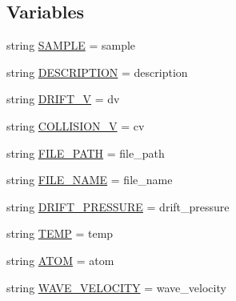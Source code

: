 \subsection*{Variables}
\begin{DoxyCompactItemize}
\item 
string \hyperlink{namespace_uni_dec_1_1unidec__modules_1_1tims__import__wizard_1_1_tag_types_a9037ee696451cc7485ee9fe1deca2dae}{S\+A\+M\+P\+L\+E} = \textquotesingle{}sample\textquotesingle{}
\item 
string \hyperlink{namespace_uni_dec_1_1unidec__modules_1_1tims__import__wizard_1_1_tag_types_a98a471d99be4bf079d51798235be79b3}{D\+E\+S\+C\+R\+I\+P\+T\+I\+O\+N} = \textquotesingle{}description\textquotesingle{}
\item 
string \hyperlink{namespace_uni_dec_1_1unidec__modules_1_1tims__import__wizard_1_1_tag_types_a6e65191c0c073808709bf24baa7c6ecf}{D\+R\+I\+F\+T\+\_\+\+V} = \textquotesingle{}dv\textquotesingle{}
\item 
string \hyperlink{namespace_uni_dec_1_1unidec__modules_1_1tims__import__wizard_1_1_tag_types_ad737928630b2ee73fea7cdfc1906eb77}{C\+O\+L\+L\+I\+S\+I\+O\+N\+\_\+\+V} = \textquotesingle{}cv\textquotesingle{}
\item 
string \hyperlink{namespace_uni_dec_1_1unidec__modules_1_1tims__import__wizard_1_1_tag_types_a6a080ac8379dd1c3ccef9113da2a8d1a}{F\+I\+L\+E\+\_\+\+P\+A\+T\+H} = \textquotesingle{}file\+\_\+path\textquotesingle{}
\item 
string \hyperlink{namespace_uni_dec_1_1unidec__modules_1_1tims__import__wizard_1_1_tag_types_a97d40ed16eb01a95199c2d1911814bce}{F\+I\+L\+E\+\_\+\+N\+A\+M\+E} = \textquotesingle{}file\+\_\+name\textquotesingle{}
\item 
string \hyperlink{namespace_uni_dec_1_1unidec__modules_1_1tims__import__wizard_1_1_tag_types_a8940a4cfb1960233e95aac55f3f98792}{D\+R\+I\+F\+T\+\_\+\+P\+R\+E\+S\+S\+U\+R\+E} = \textquotesingle{}drift\+\_\+pressure\textquotesingle{}
\item 
string \hyperlink{namespace_uni_dec_1_1unidec__modules_1_1tims__import__wizard_1_1_tag_types_a17d5dbf87f89e483b5ca64feb7776f44}{T\+E\+M\+P} = \textquotesingle{}temp\textquotesingle{}
\item 
string \hyperlink{namespace_uni_dec_1_1unidec__modules_1_1tims__import__wizard_1_1_tag_types_a10264a8685c2679af34e5b4d501e70d7}{A\+T\+O\+M} = \textquotesingle{}atom\textquotesingle{}
\item 
string \hyperlink{namespace_uni_dec_1_1unidec__modules_1_1tims__import__wizard_1_1_tag_types_a10160681d26f753b703da137e4de3124}{W\+A\+V\+E\+\_\+\+V\+E\+L\+O\+C\+I\+T\+Y} = \textquotesingle{}wave\+\_\+velocity\textquotesingle{}

\end{DoxyCompactItemize}
